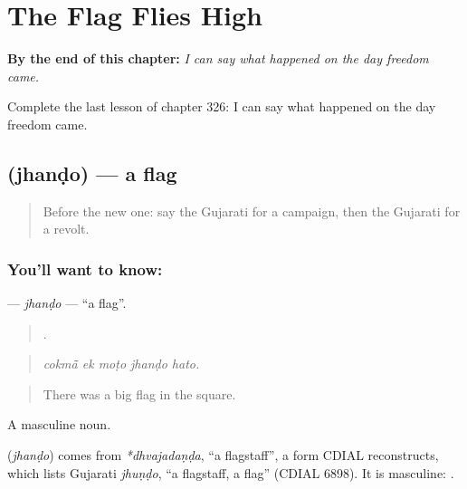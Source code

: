 
\chapter{The Flag Flies High}
\label{ch:gu-the-flag-flies-high}

\begin{chapteropening}
\textbf{By the end of this chapter:} \emph{I can say what happened on the day freedom came.}

Complete the last lesson of chapter 326: I can say what happened on the day freedom came.
\end{chapteropening}

\section[\texorpdfstring{\gu{ઝંડો} (jhanḍo)}{ઝંડો (jhanḍo)}]{ (jhanḍo) — a flag}

\label{lesson:GU-C326-jhando}



\begin{quote}
Before the new one: say the Gujarati for a campaign, then the Gujarati for a revolt.
\end{quote}

\subsection*{You'll want to know: }
\textbf{} — \emph{jhanḍo} — \textquotedblleft{}a flag\textquotedblright{}.

\begin{quote}
    .
\end{quote}

\begin{quote}
\emph{cokmā̃ ek moṭo jhanḍo hato.}
\end{quote}

\begin{quote}
There was a big flag in the square.
\end{quote}

A masculine noun.

\begin{cousinweb}
\textbf{} (\emph{jhanḍo}) comes from \emph{*dhvajadaṇḍa}, \textquotedblleft{}a flagstaff\textquotedblright{}, a form CDIAL reconstructs, which lists Gujarati \emph{jhuṇḍo}, \textquotedblleft{}a flagstaff, a flag\textquotedblright{} (CDIAL 6898). It is masculine: \textbf{ }.
\end{cousinweb}

